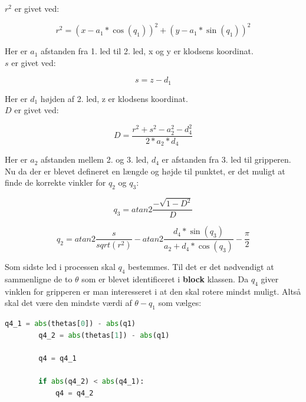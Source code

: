 $r^2$ er givet ved:

\begin{equation}
r^2 = (x - a_1 * \cos(q_1))^2 + (y - a_1 * \sin(q_1))^2
\end{equation}

Her er $a_1$ afstanden fra 1. led til 2. led, x og y er klodsens koordinat.\\

$s$ er givet ved:

\begin{equation}
s = z - d_1
\end{equation}

Her er $d_1$ højden af 2. led, z er klodsens koordinat.\\

$D$ er givet ved:

\begin{equation}
D = \frac{r^2 + s^2 - a_2^2 - d_4^2}{2 * a_2 * d_4}
\end{equation}

Her er $a_2$ afstanden mellem 2. og 3. led, $d_4$ er afstanden fra 3. led til gripperen.\\

Nu da der er blevet defineret en længde og højde til punktet, er det muligt at finde de korrekte vinkler for $q_2$ og $q_3$:

\begin{equation}
q_3 = atan2\frac{-\sqrt{1 - D^2}}{D}
\end{equation}

\begin{equation}
q_2 = atan2\frac{s}{sqrt(r^2)} - atan2\frac{d_4 * \sin(q_3)}{a_2 + d_4 * \cos(q_3)} - \frac{\pi}{2}
\end{equation}

Som sidste led i processen skal $q_4$ bestemmes. Til det er det nødvendigt at sammenligne de to $\theta$ som er blevet identificeret i \textbf{block} klassen. Da $q_4$ giver vinklen for gripperen er man interesseret i at den skal rotere mindst muligt. Altså skal det være den mindste værdi af $\theta - q_1$ som vælges:

\begin{lstlisting}[caption=if sætning $q_4$, label=q4 bestemmelse, language=Python]
        q4_1 = abs(thetas[0]) - abs(q1)
        q4_2 = abs(thetas[1]) - abs(q1)

        q4 = q4_1

        if abs(q4_2) < abs(q4_1):
            q4 = q4_2
\end{lstlisting}

